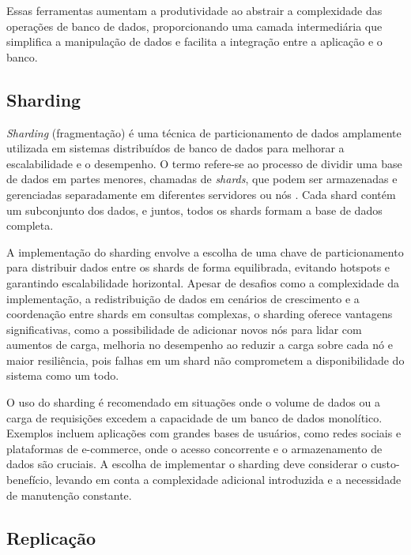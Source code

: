 Essas ferramentas aumentam a produtividade ao abstrair a complexidade das operações de banco de dados, proporcionando uma camada intermediária que simplifica a manipulação de dados e facilita a integração entre a aplicação e o banco.


\subsection{Sharding}


\emph{Sharding} (fragmentação) é uma técnica de particionamento de dados amplamente utilizada em sistemas distribuídos de banco de dados para melhorar a escalabilidade e o desempenho. O termo refere-se ao processo de dividir uma base de dados em partes menores, chamadas de \emph{shards}, que podem ser armazenadas e gerenciadas separadamente em diferentes servidores ou nós \cite{sharding-mongodb}. Cada shard contém um subconjunto dos dados, e juntos, todos os shards formam a base de dados completa.

A implementação do sharding envolve a escolha de uma chave de particionamento para distribuir dados entre os shards de forma equilibrada, evitando hotspots e garantindo escalabilidade horizontal. Apesar de desafios como a complexidade da implementação, a redistribuição de dados em cenários de crescimento e a coordenação entre shards em consultas complexas, o sharding oferece vantagens significativas, como a possibilidade de adicionar novos nós para lidar com aumentos de carga, melhoria no desempenho ao reduzir a carga sobre cada nó e maior resiliência, pois falhas em um shard não comprometem a disponibilidade do sistema como um todo.

O uso do sharding é recomendado em situações onde o volume de dados ou a carga de requisições excedem a capacidade de um banco de dados monolítico. Exemplos incluem aplicações com grandes bases de usuários, como redes sociais e plataformas de e-commerce, onde o acesso concorrente e o armazenamento de dados são cruciais. A escolha de implementar o sharding deve considerar o custo-benefício, levando em conta a complexidade adicional introduzida e a necessidade de manutenção constante.

\subsection{Replicação}

